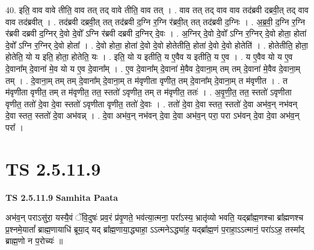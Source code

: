 \documentclass[17pt]{extarticle}
\begin{document}
40. इति॒ वाव वावे तीति॒ वाव तत् तद् वावे तीति॒ वाव तत् । . वाव तत् तद् वाव वाव तद॑ब्रवी दब्रवी॒त् तद् वाव वाव तद॑ब्रवीत् । . तद॑ब्रवी दब्रवी॒त् तत् तद॑ब्रवी द॒ग्नि र॒ग्नि र॑ब्रवी॒त् तत् तद॑ब्रवी द॒ग्निः । . अ॒ब्र॒वी॒ द॒ग्नि र॒ग्नि र॑ब्रवी दब्रवी द॒ग्निर् दे॒वो दे॒वो᳚ ऽग्नि र॑ब्रवी दब्रवी द॒ग्निर् दे॒वः । . अ॒ग्निर् दे॒वो दे॒वो᳚ ऽग्नि र॒ग्निर् दे॒वो होता॒ होता॑ दे॒वो᳚ ऽग्नि र॒ग्निर् दे॒वो होता᳚ । . दे॒वो होता॒ होता॑ दे॒वो दे॒वो होतेतीति॒ होता॑ दे॒वो दे॒वो होतेति॑ । . होतेतीति॒ होता॒ होतेति॒ यो य इति॒ होता॒ होतेति॒ यः । . इति॒ यो य इतीति॒ य ए॒वैव य इतीति॒ य ए॒व । . य ए॒वैव यो य ए॒व दे॒वाना᳚म् दे॒वाना॑ मे॒व यो य ए॒व दे॒वाना᳚म् । . ए॒व दे॒वाना᳚म् दे॒वाना॑ मे॒वैव दे॒वाना॒म् तम् तम् दे॒वाना॑ मे॒वैव दे॒वाना॒म् तम् । . दे॒वाना॒म् तम् तम् दे॒वाना᳚म् दे॒वाना॒म् त म॑वृणीता वृणीत॒ तम् दे॒वाना᳚म् दे॒वाना॒म् त म॑वृणीत । . त म॑वृणीता वृणीत॒ तम् त म॑वृणीत॒ तत॒ स्ततो॑ ऽवृणीत॒ तम् त म॑वृणीत॒ ततः॑ । . अ॒वृ॒णी॒त॒ तत॒ स्ततो॑ ऽवृणीता वृणीत॒ ततो॑ दे॒वा दे॒वा स्ततो॑ ऽवृणीता वृणीत॒ ततो॑ दे॒वाः । . ततो॑ दे॒वा दे॒वा स्तत॒ स्ततो॑ दे॒वा अभ॑व॒न् नभ॑वन् दे॒वा स्तत॒ स्ततो॑ दे॒वा अभ॑वन्न् । . दे॒वा अभ॑व॒न् नभ॑वन् दे॒वा दे॒वा अभ॑व॒न् परा॒ परा ऽभ॑वन् दे॒वा दे॒वा अभ॑व॒न् परा᳚ । \newline
\pagebreak
{}
\section*{ TS 2.5.11.9 }

\textbf{TS 2.5.11.9 } \newline
\textbf{Samhita Paata} \newline

अभ॑व॒न् पराऽसु॑रा॒ यस्यै॒वं ॅवि॒दुषः॑ प्रव॒रं प्र॑वृ॒णते॒ भव॑त्या॒त्मना॒ परा᳚ऽस्य॒ भ्रातृ॑व्यो भवति॒ यद्ब्रा᳚ह्म॒णश्चा ब्रा᳚ह्मणश्च प्र॒श्नमे॒यातां᳚ ब्राह्म॒णायाधि॑ ब्रूया॒द् यद् ब्रा᳚ह्म॒णाया॒द्ध्याहा॒ ऽऽत्मनेऽद्ध्या॑ह॒ यद्ब्रा᳚ह्म॒णं प॒राहा॒ऽऽत्मानं॒ परा॑ऽऽह॒ तस्मा᳚द् ब्राह्म॒णो न प॒रोच्यः॑ ॥ \newline
\end{document}
